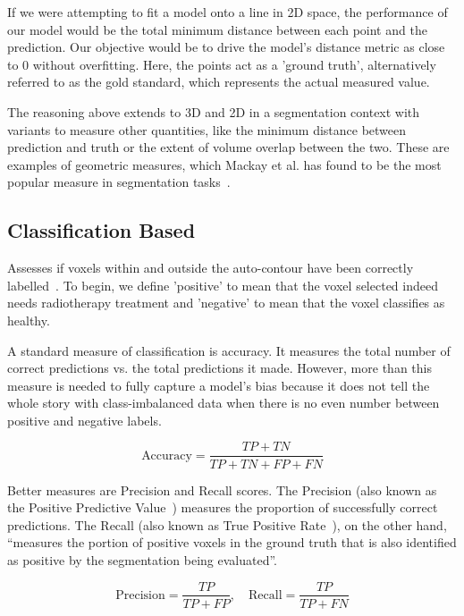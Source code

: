 \documentclass[11pt,twoside]{report}
\begin{document}
If we were attempting to fit a model onto a line in 2D space, the performance of our model would be the total minimum distance between each point and the prediction. Our objective would be to drive the model's distance metric as close to 0 without overfitting. Here, the points act as a 'ground truth', alternatively referred to as the gold standard, which represents the actual measured value.

The reasoning above extends to 3D and 2D in a segmentation context with variants to measure other quantities, like the minimum distance between prediction and truth or the extent of volume overlap between the two. These are examples of geometric measures, which Mackay et al. has found to be the most popular measure in segmentation tasks~\cite{review-metrics}.

\subsection{Classification Based}\label{sect:classification-based}

Assesses if voxels within and outside the auto-contour have been correctly labelled~\cite{review-metrics}. To begin, we define 'positive' to mean that the voxel selected indeed needs radiotherapy treatment and 'negative' to mean that the voxel classifies as healthy.

A standard measure of classification is accuracy. It measures the total number of correct predictions vs. the total predictions it made. However, more than this measure is needed to fully capture a model's bias because it does not tell the whole story with class-imbalanced data when there is no even number between positive and negative labels.

\begin{equation*}
 \text{Accuracy} = \frac{TP + TN}{TP + TN + FP + FN}
\end{equation*}

Better measures are Precision and Recall scores. The Precision (also known as the Positive Predictive Value~\cite{evaluation-metrics}) measures the proportion of successfully correct predictions. The Recall (also known as True Positive Rate~\cite{evaluation-metrics}), on the other hand, ``measures the portion of positive voxels in the ground truth that is also identified as positive by the segmentation being evaluated''.

\begin{equation*}
 \text{Precision} = \frac{TP}{TP+FP}, \quad \text{Recall} = \frac{TP}{TP+FN}
\end{equation*}
\end{document}
